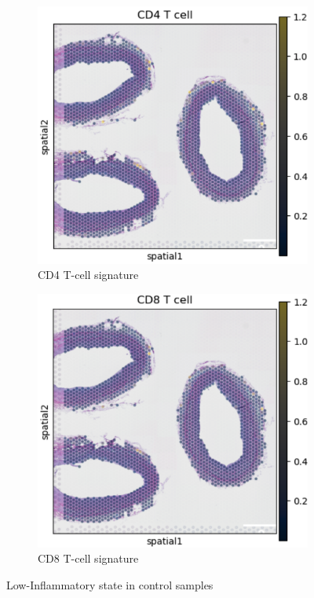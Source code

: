 \documentclass[a4paper,12pt]{article}
\begin{document}
\begin{figure}[H]
\centering
\begin{subfigure}{0.4\textwidth}
\includegraphics[width=\textwidth]{cd4pa2}
\caption{CD4 T-cell signature}
\label{fig:control_spatial}
\end{subfigure}
\hfill
\begin{subfigure}{0.4\textwidth}
\includegraphics[width=\textwidth]{cd8pa3}
\caption{CD8 T-cell signature}
\label{fig:atherosclerosis_spatial}
\end{subfigure}
\caption{Low-Inflammatory state in control samples}
\label{fig:spatial_deconvolution}
\end{figure}
\end{document}
